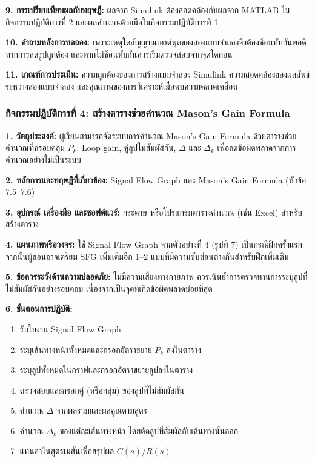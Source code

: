 \textbf{9. การเปรียบเทียบผลกับทฤษฎี:} ผลจาก Simulink ต้องสอดคล้องกับผลจาก MATLAB ในกิจกรรมปฏิบัติการที่ 2 และผลคำนวณด้วยมือในกิจกรรมปฏิบัติการที่ 1

\textbf{10. คำถามหลังการทดลอง:} เพราะเหตุใดสัญญาณเอาต์พุตของสองแบบจำลองจึงต้องซ้อนทับกันพอดีหากการลดรูปถูกต้อง และหากไม่ซ้อนทับกันควรเริ่มตรวจสอบจากจุดใดก่อน

\textbf{11. เกณฑ์การประเมิน:} ความถูกต้องของการสร้างแบบจำลอง Simulink ความสอดคล้องของผลลัพธ์ระหว่างสองแบบจำลอง และคุณภาพของการวิเคราะห์เมื่อพบความคลาดเคลื่อน

\subsubsection{กิจกรรมปฏิบัติการที่ 4: สร้างตารางช่วยคำนวณ Mason's Gain Formula}

\textbf{1. วัตถุประสงค์:} ผู้เรียนสามารถจัดระบบการคำนวณ Mason's Gain Formula ด้วยตารางช่วยคำนวณที่ครอบคลุม $P_k$, Loop gain, คู่ลูปไม่สัมผัสกัน, $\Delta$ และ $\Delta_k$ เพื่อลดข้อผิดพลาดจากการคำนวณอย่างไม่เป็นระบบ

\textbf{2. หลักการและทฤษฎีที่เกี่ยวข้อง:} Signal Flow Graph และ Mason's Gain Formula (หัวข้อ 7.5–7.6)

\textbf{3. อุปกรณ์ เครื่องมือ และซอฟต์แวร์:} กระดาษ หรือโปรแกรมตารางคำนวณ (เช่น Excel) สำหรับสร้างตาราง

\textbf{4. แผนภาพหรือวงจร:} ใช้ Signal Flow Graph จากตัวอย่างที่ 4 (รูปที่ 7) เป็นกรณีฝึกครั้งแรก จากนั้นผู้สอนอาจเตรียม SFG เพิ่มเติมอีก 1–2 แบบที่มีความซับซ้อนต่างกันสำหรับฝึกเพิ่มเติม

\textbf{5. ข้อควรระวังด้านความปลอดภัย:} ไม่มีความเสี่ยงทางกายภาพ ควรเน้นย้ำการตรวจทานการระบุลูปที่ไม่สัมผัสกันอย่างรอบคอบ เนื่องจากเป็นจุดที่เกิดข้อผิดพลาดบ่อยที่สุด

\textbf{6. ขั้นตอนการปฏิบัติ:}
\begin{enumerate}
    \item รับใบงาน Signal Flow Graph
    \item ระบุเส้นทางหน้าทั้งหมดและกรอกอัตราขยาย $P_k$ ลงในตาราง
    \item ระบุลูปทั้งหมดในกราฟและกรอกอัตราขยายลูปลงในตาราง
    \item ตรวจสอบและกรอกคู่ (หรือกลุ่ม) ของลูปที่ไม่สัมผัสกัน
    \item คำนวณ $\Delta$ จากผลรวมและผลคูณตามสูตร
    \item คำนวณ $\Delta_k$ ของแต่ละเส้นทางหน้า โดยตัดลูปที่สัมผัสกับเส้นทางนั้นออก
    \item แทนค่าในสูตรเมสันเพื่อสรุปผล $C(s)/R(s)$
\end{enumerate}

